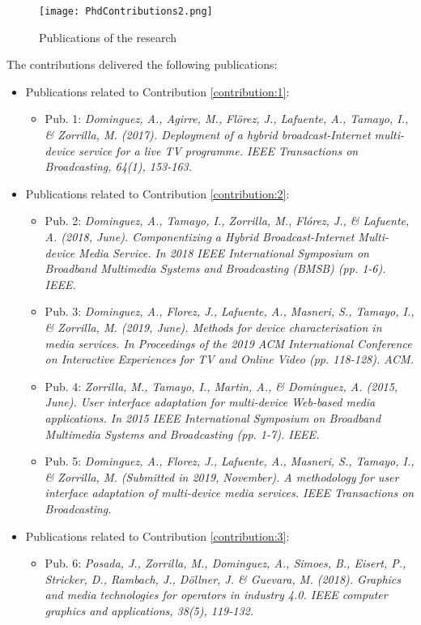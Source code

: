 \begin{figure}
	\centering
	\texttt{[image: PhdContributions2.png]}
	\caption[Publications of the research]{Publications of the research}
	\label{fig:PhdPublications}
\end{figure}

The contributions delivered the following publications:
\begin{itemize}
	\item Publications related to Contribution \ref{contribution:1}:
	\begin{itemize}
		\item Pub. 1: \textit{Dominguez, A., Agirre, M., Flörez, J., Lafuente, A., Tamayo, I., \& Zorrilla, M. (2017). Deployment of a hybrid broadcast-Internet multi-device service for a live TV programme. IEEE Transactions on Broadcasting, 64(1), 153-163.}
	\end{itemize}
	\item Publications related to Contribution \ref{contribution:2}:
	\begin{itemize}
		\item Pub. 2: \textit{Dominguez, A., Tamayo, I., Zorrilla, M., Flórez, J., \& Lafuente, A. (2018, June). Componentizing a Hybrid Broadcast-Internet Multi-device Media Service. In 2018 IEEE International Symposium on Broadband Multimedia Systems and Broadcasting (BMSB) (pp. 1-6). IEEE.}
		\item Pub. 3: \textit{Dominguez, A., Florez, J., Lafuente, A., Masneri, S., Tamayo, I., \& Zorrilla, M. (2019, June). Methods for device characterisation in media services. In Proceedings of the 2019 ACM International Conference on Interactive Experiences for TV and Online Video (pp. 118-128). ACM.}
		\item Pub. 4: \textit{Zorrilla, M., Tamayo, I., Martin, A., \& Dominguez, A. (2015, June). User interface adaptation for multi-device Web-based media applications. In 2015 IEEE International Symposium on Broadband Multimedia Systems and Broadcasting (pp. 1-7). IEEE.}
		\item Pub. 5: \textit{Dominguez, A., Florez, J., Lafuente, A., Masneri, S., Tamayo, I., \& Zorrilla, M. (Submitted in 2019, November). A methodology for user interface adaptation of multi-device media services. IEEE Transactions on Broadcasting.}
	\end{itemize}
	\item Publications related to Contribution \ref{contribution:3}:
	\begin{itemize}	
		\item Pub. 6: \textit{Posada, J., Zorrilla, M., Dominguez, A., Simoes, B., Eisert, P., Stricker, D., Rambach, J., Döllner, J. \& Guevara, M. (2018). Graphics and media technologies for operators in industry 4.0. IEEE computer graphics and applications, 38(5), 119-132.}
	\end{itemize}
	
\end{itemize}

